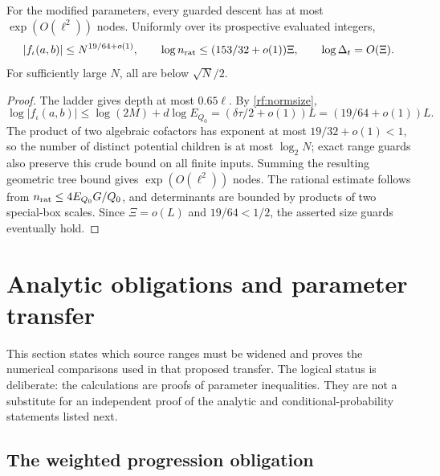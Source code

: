 \begin{proposition}
\label{rf:treebounds}
For the modified parameters, every guarded descent has at most
$\exp(O(\ell^2))$ nodes.  Uniformly over its prospective evaluated
integers,
\[
 |f_\iota(a,b)|\le N^{19/64+o(1)},\qquad
 \log n_{\rm rat}\le(153/32+o(1))\Xi,\qquad
 \log\Delta_t=O(\Xi).
\]
For sufficiently large $N$, all are below $\sqrt N/2$.
\end{proposition}
\begin{proof}
The ladder gives depth at most $0.65\ell$.  By
\eqref{rf:normsize},
\[
 \log|f_\iota(a,b)|\le\log(2M)+d\log E_{Q_0}
                    =(\delta\tau/2+o(1))L
                    =(19/64+o(1))L.
\]
The product of two algebraic cofactors has exponent at most
$19/32+o(1)<1$, so the number of distinct potential children is
at most $\log_2N$; exact range guards also preserve this crude
bound on all finite inputs.  Summing the resulting geometric tree
bound gives $\exp(O(\ell^2))$ nodes.  The rational estimate follows
from $n_{\rm rat}\le4E_{Q_0}G/Q_0$, and determinants are bounded
by products of two special-box scales.  Since $\Xi=o(L)$ and
$19/64<1/2$, the asserted size guards eventually hold.
\end{proof}

\section{Analytic obligations and parameter transfer}
\label{rf:analyticcontract}

This section states which source ranges must be widened and proves
the numerical comparisons used in that proposed transfer.  The
logical status is deliberate: the calculations are proofs of
parameter inequalities.  They are not a substitute for an
independent proof of the analytic and conditional-probability
statements listed next.

\subsection{The weighted progression obligation}

